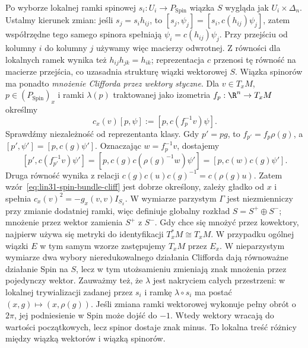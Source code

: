 Po wyborze lokalnej ramki spinowej $s_i:U_i\to P_{\mathrm{Spin}}$
wiązka $S$ wygląda jak $U_i\times\Delta_n$. Ustalmy kierunek
zmian: jeśli $s_j=s_i h_{ij}$, to
$[s_j,\psi_j]=[s_i,c(h_{ij})\psi_j]$, zatem współrzędne
tego samego spinora spełniają $\psi_i=c(h_{ij})\psi_j$.
Przy przejściu od kolumny $i$ do kolumny $j$ używamy więc
macierzy odwrotnej. Z równości dla lokalnych ramek wynika też
$h_{ij}h_{jk}=h_{ik}$; reprezentacja $c$ przenosi tę równość
na macierze przejścia, co uzasadnia strukturę wiązki wektorowej $S$.
Wiązka spinorów ma ponadto \emph{mnożenie Clifforda przez wektory
styczne}. Dla $v\in T_xM$, $p\in(P_{\mathrm{Spin}})_x$ i
ramki $\lambda(p)$ traktowanej jako izometria
$f_p:\R^n\to T_xM$ określmy
\begin{equation}\label{eq:lin31-spin-bundle-cliff}
 c_x(v)[p,\psi]
   :=[p,c(f_p^{-1}v)\psi].
\end{equation}
Sprawdźmy niezależność od reprezentanta klasy. Gdy $p'=pg$,
to $f_{p'}=f_p\rho(g)$, a $[p',\psi']=[p,c(g)\psi']$.
Oznaczając $w=f_p^{-1}v$, dostajemy
\[
 [p',c(f_{p'}^{-1}v)\psi']
 =[p,c(g)c(\rho(g)^{-1}w)\psi']
 =[p,c(w)c(g)\psi'].
\]
Druga równość wynika z relacji
$c(g)c(u)c(g)^{-1}=c(\rho(g)u)$.
Zatem wzór~\eqref{eq:lin31-spin-bundle-cliff} jest dobrze określony,
zależy gładko od $x$ i spełnia
$c_x(v)^2=-g_x(v,v)I_{S_x}$.
W wymiarze parzystym $\Gamma$ jest niezmienniczy przy zmianie
dodatniej ramki, więc definiuje globalny rozkład
$S=S^+\oplus S^-$; mnożenie przez wektor zamienia $S^+$ z $S^-$.
Gdy chce się mnożyć przez kowektory, najpierw używa się metryki
do identyfikacji $T_x^*M\cong T_xM$.
W przypadku ogólnej wiązki $E$ w tym samym wzorze zastępujemy
$T_xM$ przez $E_x$.
W nieparzystym wymiarze dwa wybory nieredukowalnego działania
Clifforda dają równoważne działanie Spin na $S$, lecz w tym
utożsamieniu zmieniają znak mnożenia przez pojedynczy wektor.
Zauważmy też, że $\lambda$ jest nakryciem całych przestrzeni:
w lokalnej trywializacji zadanej przez $s_i$ i ramkę $\lambda\circ s_i$
ma postać $(x,g)\mapsto(x,\rho(g))$.
Jeśli zmiana ramki wektorowej wykonuje pełny
obrót o $2\pi$, jej podniesienie w Spin
może dojść do $-1$. Wtedy wektory wracają
do wartości początkowych, lecz spinor dostaje
znak minus. To lokalna treść różnicy między
wiązką wektorów i wiązką spinorów.

